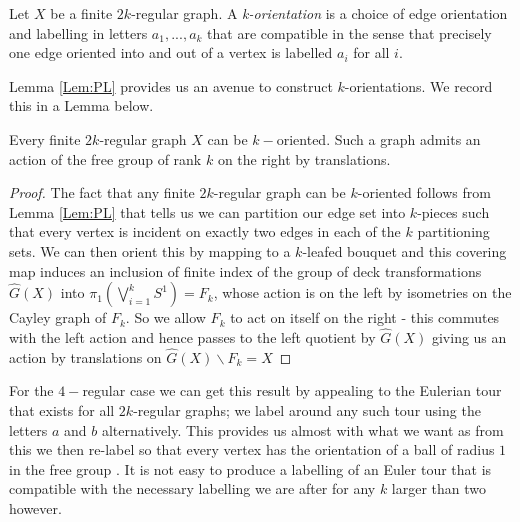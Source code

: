 \begin{conjecture}
\begin{definition}
Let $X$ be a finite $2k$-regular graph. A \textit{k-orientation} is a choice of edge orientation and labelling in letters $a_{1},...,a_{k}$ that are compatible in the sense that precisely one edge oriented into and out of a vertex is labelled $a_{i}$ for all $i$.
\end{definition}

Lemma \ref{Lem:PL} provides us an avenue to construct $k$-orientations. We record this in a Lemma below.
\begin{lemma}\label{Lem:MT1}
Every finite $2k$-regular graph $X$ can be $k-$oriented. Such a graph admits an action of the free group of rank $k$ on the right by translations.
\end{lemma}
\begin{proof}
The fact that any finite $2k$-regular graph can be $k$-oriented follows from Lemma \ref{Lem:PL} that tells us we can partition our edge set into $k$-pieces such that every vertex is incident on exactly two edges in each of the $k$ partitioning sets. We can then orient this by mapping to a $k$-leafed bouquet and this covering map induces an inclusion of finite index of the group of deck transformations $\widehat{G}(X)$ into $\pi_{1}(\bigvee_{i=1}^{k}S^{1})=F_{k}$, whose action is on the left by isometries on the Cayley graph of $F_{k}$. So we allow $F_{k}$ to act on itself on the right - this commutes with the left action and hence passes to the left quotient by $\widehat{G}(X)$ giving us an action by translations on $\widehat{G}(X)\backslash F_{k}=X$
\end{proof}

\begin{remark}
For the $4-$regular case we can get this result by appealing to the Eulerian tour that exists for all $2k$-regular graphs; we label around any such tour using the letters $a$ and $b$ alternatively. This provides us almost with what we want as from this we then re-label so that every vertex has the orientation of a ball of radius $1$ in the free group \cite[pg 57]{MR1867354}. It is not easy to produce a labelling of an Euler tour that is compatible with the necessary labelling we are after for any $k$ larger than two however.
\end{remark}

\begin{comment}
\begin{figure}[h]
\texttt{[image: Diagrams/Diagram3.png]}
\caption{Arriving at an action from an Euler Tour}
\label{Fig:AT}
\end{figure}
\end{comment}


\end{conjecture}

